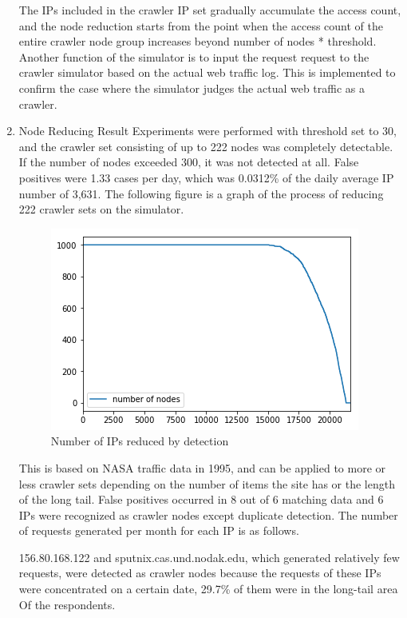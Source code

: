 \begin{enumerate}
The IPs included in the crawler IP set gradually accumulate the access count, and the node reduction starts from the point when the access count of the entire crawler node group increases beyond {number of nodes} * {threshold}.
Another function of the simulator is to input the request request to the crawler simulator based on the actual web traffic log. This is implemented to confirm the case where the simulator judges the actual web traffic as a crawler.
\newline
\item Node Reducing Result
\newline 
Experiments were performed with threshold set to 30, and the crawler set consisting of up to 222 nodes was completely detectable. If the number of nodes exceeded 300, it was not detected at all. False positives were 1.33 cases per day, which was 0.0312\% of the daily average IP number of 3,631. The following figure is a graph of the process of reducing 222 crawler sets on the simulator.

\begin{figure}[H]
    \centering
    \includegraphics[width=0.7\columnwidth]{figs/figure_06_nr.png}
    \caption{Number of IPs reduced by detection}
    \label{fig:my_label}
\end{figure}

This is based on NASA traffic data in 1995, and can be applied to more or less crawler sets depending on the number of items the site has or the length of the long tail.
False positives occurred in 8 out of 6 matching data and 6 IPs were recognized as crawler nodes except duplicate detection. The number of requests generated per month for each IP is as follows.

156.80.168.122 and sputnix.cas.und.nodak.edu, which generated relatively few requests, were detected as crawler nodes because the requests of these IPs were concentrated on a certain date, 29.7\% of them were in the long-tail area Of the respondents.

\end{enumerate}



